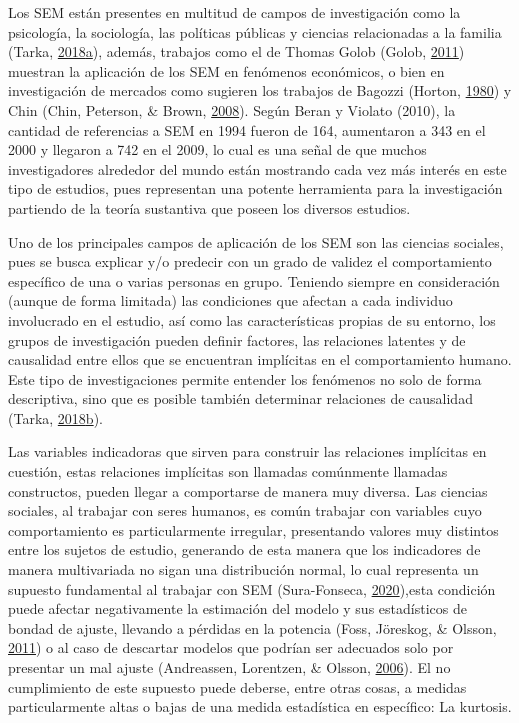 \documentclass[
]{article}
\begin{document}
Los SEM están presentes en multitud de campos de investigación como la
psicología, la sociología, las políticas públicas y ciencias
relacionadas a la familia (Tarka,
\protect\hyperlink{ref-tarka}{2018}\protect\hyperlink{ref-tarka}{a}),
además, trabajos como el de Thomas Golob (Golob,
\protect\hyperlink{ref-golob}{2011}) muestran la aplicación de los SEM
en fenómenos económicos, o bien en investigación de mercados como
sugieren los trabajos de Bagozzi (Horton,
\protect\hyperlink{ref-bagozzi}{1980}) y Chin (Chin, Peterson, \& Brown,
\protect\hyperlink{ref-chin}{2008}). Según Beran y Violato (2010), la
cantidad de referencias a SEM en 1994 fueron de 164, aumentaron a 343 en
el 2000 y llegaron a 742 en el 2009, lo cual es una señal de que muchos
investigadores alrededor del mundo están mostrando cada vez más interés
en este tipo de estudios, pues representan una potente herramienta para
la investigación partiendo de la teoría sustantiva que poseen los
diversos estudios.

Uno de los principales campos de aplicación de los SEM son las ciencias
sociales, pues se busca explicar y/o predecir con un grado de validez el
comportamiento específico de una o varias personas en grupo. Teniendo
siempre en consideración (aunque de forma limitada) las condiciones que
afectan a cada individuo involucrado en el estudio, así como las
características propias de su entorno, los grupos de investigación
pueden definir factores, las relaciones latentes y de causalidad entre
ellos que se encuentran implícitas en el comportamiento humano. Este
tipo de investigaciones permite entender los fenómenos no solo de forma
descriptiva, sino que es posible también determinar relaciones de
causalidad (Tarka,
\protect\hyperlink{ref-Tarka}{2018}\protect\hyperlink{ref-Tarka}{b}).

Las variables indicadoras que sirven para construir las relaciones
implícitas en cuestión, estas relaciones implícitas son llamadas
comúnmente llamadas constructos, pueden llegar a comportarse de manera
muy diversa. Las ciencias sociales, al trabajar con seres humanos, es
común trabajar con variables cuyo comportamiento es particularmente
irregular, presentando valores muy distintos entre los sujetos de
estudio, generando de esta manera que los indicadores de manera
multivariada no sigan una distribución normal, lo cual representa un
supuesto fundamental al trabajar con SEM (Sura-Fonseca,
\protect\hyperlink{ref-sura}{2020}),esta condición puede afectar
negativamente la estimación del modelo y sus estadísticos de bondad de
ajuste, llevando a pérdidas en la potencia (Foss, Jöreskog, \& Olsson,
\protect\hyperlink{ref-foss}{2011}) o al caso de descartar modelos que
podrían ser adecuados solo por presentar un mal ajuste (Andreassen,
Lorentzen, \& Olsson, \protect\hyperlink{ref-andreassen}{2006}). El no
cumplimiento de este supuesto puede deberse, entre otras cosas, a
medidas particularmente altas o bajas de una medida estadística en
específico: La kurtosis.
\end{document}
